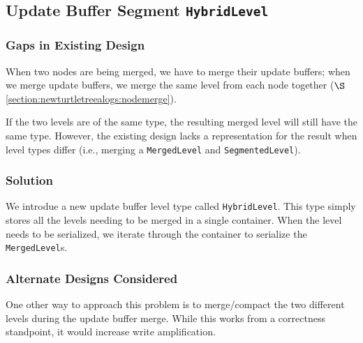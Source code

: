 \documentclass[11pt]{article}
\begin{document}
\subsection{Update Buffer Segment \texttt{HybridLevel}}\label{section:datastructureupdates:hybridlevel}

\subsubsection{Gaps in Existing Design}
When two nodes are being merged, we have to merge their update buffers; when we merge update buffers, we merge the same level from each node together ($\S$\ref{section:newturtletreealogs:nodemerge}).

If the two levels are of the same type, the resulting merged level will still have the same type. However, the existing design lacks a representation for the result when level types differ (i.e., merging a \texttt{MergedLevel} and \texttt{SegmentedLevel}).

\subsubsection{Solution}
We introdue a new update buffer level type called \texttt{HybridLevel}. This type simply stores all the levels needing to be merged in a single container. When the level needs to be serialized, we iterate through the container to serialize the \texttt{MergedLevel}s.

\subsubsection{Alternate Designs Considered}
One other way to approach this problem is to merge/compact the two different levels during the update buffer merge. While this works from a correctness standpoint, it would increase write amplification.
\end{document}
